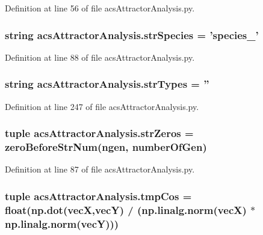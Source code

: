 Definition at line 56 of file acs\+Attractor\+Analysis.\+py.

\hypertarget{a00124_aa76707ba3058ba96fc8e5aeafa461193}{
\subsubsection[{str\+Species}]{\setlength{\rightskip}{0pt plus 5cm}string acs\+Attractor\+Analysis.\+str\+Species = 'species\+\_\+'}}\label{a00124_aa76707ba3058ba96fc8e5aeafa461193}


Definition at line 88 of file acs\+Attractor\+Analysis.\+py.

\hypertarget{a00124_ae5f324ca114055fca79473eecd17bb80}{
\subsubsection[{str\+Types}]{\setlength{\rightskip}{0pt plus 5cm}string acs\+Attractor\+Analysis.\+str\+Types = ''}}\label{a00124_ae5f324ca114055fca79473eecd17bb80}


Definition at line 247 of file acs\+Attractor\+Analysis.\+py.

\hypertarget{a00124_a5708d1d44920d75a918ec1c988c02c57}{
\subsubsection[{str\+Zeros}]{\setlength{\rightskip}{0pt plus 5cm}tuple acs\+Attractor\+Analysis.\+str\+Zeros = {\bf zero\+Before\+Str\+Num}(ngen, {\bf number\+Of\+Gen})}}\label{a00124_a5708d1d44920d75a918ec1c988c02c57}


Definition at line 87 of file acs\+Attractor\+Analysis.\+py.

\hypertarget{a00124_a305669433b259c5ffcb797769e7c30df}{
\subsubsection[{tmp\+Cos}]{\setlength{\rightskip}{0pt plus 5cm}tuple acs\+Attractor\+Analysis.\+tmp\+Cos = float(np.\+dot({\bf vec\+X},{\bf vec\+Y}) / (np.\+linalg.\+norm({\bf vec\+X}) $\ast$ np.\+linalg.\+norm({\bf vec\+Y})))}}\label{a00124_a305669433b259c5ffcb797769e7c30df}


